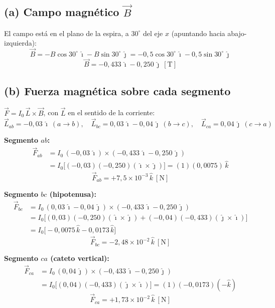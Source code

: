\documentclass[12pt,letterpaper]{article}
\begin{document}
\medskip

\subsection*{(a) Campo magn\'etico $\vec{B}$}
El campo est\'a en el plano de la espira, a $30^\circ$ del eje $x$ (apuntando hacia
abajo-izquierda):
\[
    \vec{B} = -B\cos30^\circ\,\hat{\imath} - B\sin30^\circ\,\hat{\jmath}
            = -0{,}5\cos30^\circ\,\hat{\imath} - 0{,}5\sin30^\circ\,\hat{\jmath}
\]
\[
    \boxed{\vec{B} = -0{,}433\,\hat{\imath} - 0{,}250\,\hat{\jmath}\ [\text{T}]}
\]

\subsection*{(b) Fuerza magn\'etica sobre cada segmento}
$\vec{F} = I_0\,\vec{L}\times\vec{B}$, con $\vec{L}$ en el sentido de la corriente:
\[
    \vec{L}_{ab} = -0{,}03\,\hat{\imath}\ (a\to b),\quad
    \vec{L}_{bc} = 0{,}03\,\hat{\imath}-0{,}04\,\hat{\jmath}\ (b\to c),\quad
    \vec{L}_{ca} = 0{,}04\,\hat{\jmath}\ (c\to a)
\]

\noindent\textbf{Segmento $ab$:}
\begin{align*}
    \vec{F}_{ab} &= I_0\,(-0{,}03\,\hat{\imath})\times(-0{,}433\,\hat{\imath}-0{,}250\,\hat{\jmath}) \\
                 &= I_0\big[(-0{,}03)(-0{,}250)(\hat{\imath}\times\hat{\jmath})\big]
                  = (1)(0{,}0075)\,\hat{k}
\end{align*}
\[
    \boxed{\vec{F}_{ab} = +7{,}5\times10^{-3}\,\hat{k}\ [\text{N}]}
\]

\noindent\textbf{Segmento $bc$ (hipotenusa):}
\begin{align*}
    \vec{F}_{bc} &= I_0\,(0{,}03\,\hat{\imath}-0{,}04\,\hat{\jmath})\times(-0{,}433\,\hat{\imath}-0{,}250\,\hat{\jmath}) \\
                 &= I_0\big[(0{,}03)(-0{,}250)(\hat{\imath}\times\hat{\jmath})
                    + (-0{,}04)(-0{,}433)(\hat{\jmath}\times\hat{\imath})\big] \\
                 &= I_0\big[-0{,}0075\,\hat{k} - 0{,}0173\,\hat{k}\big]
\end{align*}
\[
    \boxed{\vec{F}_{bc} = -2{,}48\times10^{-2}\,\hat{k}\ [\text{N}]}
\]

\noindent\textbf{Segmento $ca$ (cateto vertical):}
\begin{align*}
    \vec{F}_{ca} &= I_0\,(0{,}04\,\hat{\jmath})\times(-0{,}433\,\hat{\imath}-0{,}250\,\hat{\jmath}) \\
                 &= I_0\big[(0{,}04)(-0{,}433)(\hat{\jmath}\times\hat{\imath})\big]
                  = (1)(-0{,}0173)(-\hat{k})
\end{align*}
\[
    \boxed{\vec{F}_{ca} = +1{,}73\times10^{-2}\,\hat{k}\ [\text{N}]}
\]
\end{document}
